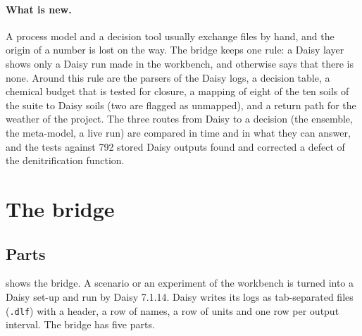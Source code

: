 \paragraph{What is new.} A process model and a decision tool usually exchange files by hand, and the origin of a number is lost on the way. The bridge keeps one rule: a Daisy layer shows only a Daisy run made in the workbench, and otherwise says that there is none. Around this rule are the parsers of the Daisy logs, a decision table, a chemical budget that is tested for closure, a mapping of eight of the ten soils of the suite to Daisy soils (two are flagged as unmapped), and a return path for the weather of the project. The three routes from Daisy to a decision (the ensemble, the meta-model, a live run) are compared in time and in what they can answer, and the tests against 792 stored Daisy outputs found and corrected a defect of the denitrification function.

\section{The bridge}
\subsection{Parts}
 shows the bridge. A scenario or an experiment of the workbench is turned into a Daisy set-up and run by Daisy 7.1.14. Daisy writes its logs as tab-separated files (\texttt{.dlf}) with a header, a row of names, a row of units and one row per output interval. The bridge has five parts.

